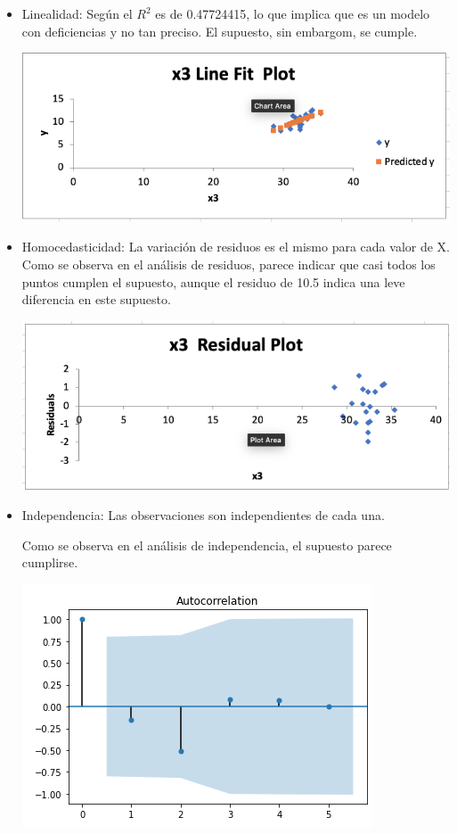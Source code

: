 \documentclass[a4paper,12pt]{article}
\begin{document}
\begin{itemize}
    \item Linealidad: Según el $R^2$ es de 0.47724415, lo que implica que es un modelo con deficiencias y no tan preciso. El supuesto, sin embargom, se cumple.
    
     \begin{center}
        \includegraphics[scale=0.5]{fit.png}
    \end{center}
    \item Homocedasticidad: La variación de residuos es el mismo para cada valor de X.\newline\newline 
    Como se observa en el análisis de residuos, parece indicar que casi todos los puntos cumplen el supuesto, aunque el residuo de 10.5 indica una leve diferencia en este supuesto.
    \begin{center}
     \includegraphics[scale=0.4]{homo.png}
    \end{center}
    \item Independencia: Las observaciones son independientes de cada una.\newline\newline 
    
    Como se observa en el análisis de independencia, el supuesto parece cumplirse.
    
    \begin{center}
     \includegraphics[scale=0.4]{inde.png}
    \end{center}
    

\end{itemize}
\end{document}
